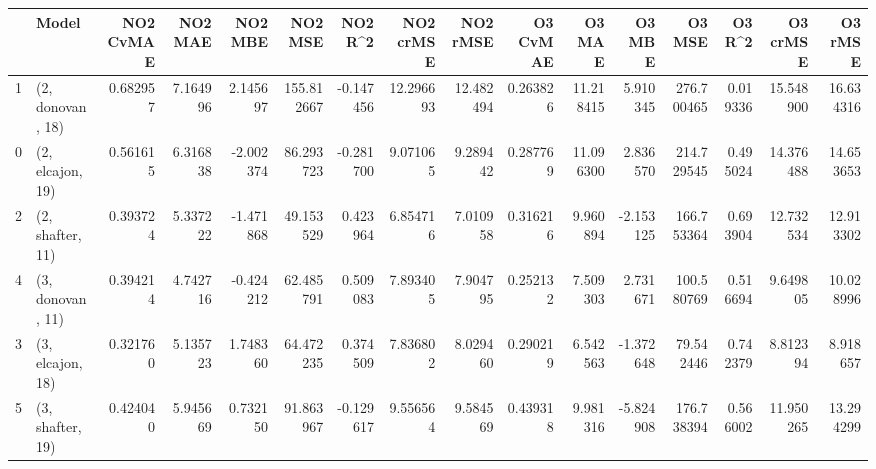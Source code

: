 \begin{tabular}{llrrrrrrrrrrrrrr}
\toprule
{} &             Model &  NO2 CvMAE &   NO2 MAE &   NO2 MBE &     NO2 MSE &   NO2 R\textasciicircum2 &  NO2 crMSE &   NO2 rMSE &  O3 CvMAE &     O3 MAE &    O3 MBE &      O3 MSE &    O3 R\textasciicircum2 &   O3 crMSE &    O3 rMSE \\
\midrule
1 &  (2, donovan, 18) &   0.682957 &  7.164996 &  2.145697 &  155.812667 & -0.147456 &  12.296693 &  12.482494 &  0.263826 &  11.218415 &  5.910345 &  276.700465 &  0.019336 &  15.548900 &  16.634316 \\
0 &  (2, elcajon, 19) &   0.561615 &  6.316838 & -2.002374 &   86.293723 & -0.281700 &   9.071065 &   9.289442 &  0.287769 &  11.096300 &  2.836570 &  214.729545 &  0.495024 &  14.376488 &  14.653653 \\
2 &  (2, shafter, 11) &   0.393724 &  5.337222 & -1.471868 &   49.153529 &  0.423964 &   6.854716 &   7.010958 &  0.316216 &   9.960894 & -2.153125 &  166.753364 &  0.693904 &  12.732534 &  12.913302 \\
4 &  (3, donovan, 11) &   0.394214 &  4.742716 & -0.424212 &   62.485791 &  0.509083 &   7.893405 &   7.904795 &  0.252132 &   7.509303 &  2.731671 &  100.580769 &  0.516694 &   9.649805 &  10.028996 \\
3 &  (3, elcajon, 18) &   0.321760 &  5.135723 &  1.748360 &   64.472235 &  0.374509 &   7.836802 &   8.029460 &  0.290219 &   6.542563 & -1.372648 &   79.542446 &  0.742379 &   8.812394 &   8.918657 \\
5 &  (3, shafter, 19) &   0.424040 &  5.945669 &  0.732150 &   91.863967 & -0.129617 &   9.556564 &   9.584569 &  0.439318 &   9.981316 & -5.824908 &  176.738394 &  0.566002 &  11.950265 &  13.294299 \\
\bottomrule
\end{tabular}
